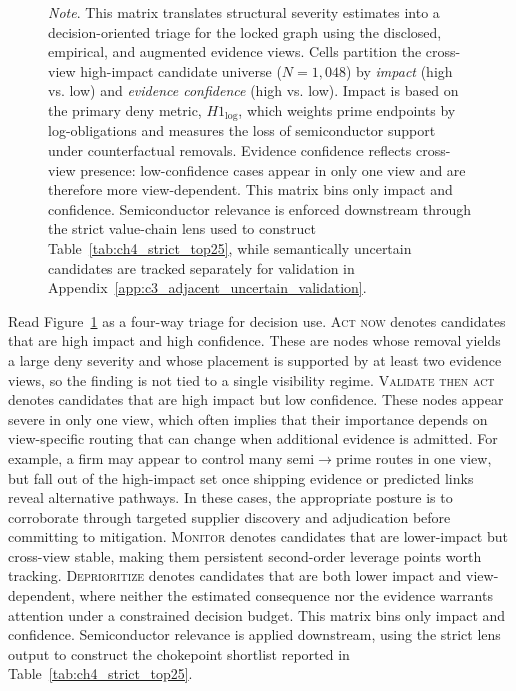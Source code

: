 \begin{figure}[tbp]
  \centering
  \caption[\textit{Action matrix for prioritizing structural chokepoints}]{\textit{Action matrix for prioritizing structural chokepoints}}
  \label{fig:ch4_action_matrix}
  

  \captionsetup{justification=raggedright,singlelinecheck=false}
  \caption*{\footnotesize \textit{Note}. This matrix translates structural severity estimates into a decision-oriented triage for the locked graph using the disclosed, empirical, and augmented evidence views. Cells partition the cross-view high-impact candidate universe ($N=1{,}048$) by \textit{impact} (high vs. low) and \textit{evidence confidence} (high vs. low). Impact is based on the primary deny metric, $H1_{\log}$, which weights prime endpoints by log-obligations and measures the loss of semiconductor support under counterfactual removals. Evidence confidence reflects cross-view presence: low-confidence cases appear in only one view and are therefore more view-dependent. This matrix bins only impact and confidence. Semiconductor relevance is enforced downstream through the strict value-chain lens used to construct Table~\ref{tab:ch4_strict_top25}, while semantically uncertain candidates are tracked separately for validation in Appendix~\ref{app:c3_adjacent_uncertain_validation}.}
\end{figure}

Read Figure~\ref{fig:ch4_action_matrix} as a four-way triage for decision use. \textsc{Act now} denotes candidates that are high impact and high confidence. These are nodes whose removal yields a large deny severity and whose placement is supported by at least two evidence views, so the finding is not tied to a single visibility regime. \textsc{Validate then act} denotes candidates that are high impact but low confidence. These nodes appear severe in only one view, which often implies that their importance depends on view-specific routing that can change when additional evidence is admitted. For example, a firm may appear to control many semi$\rightarrow$prime routes in one view, but fall out of the high-impact set once shipping evidence or predicted links reveal alternative pathways. In these cases, the appropriate posture is to corroborate through targeted supplier discovery and adjudication before committing to mitigation. \textsc{Monitor} denotes candidates that are lower-impact but cross-view stable, making them persistent second-order leverage points worth tracking. \textsc{Deprioritize} denotes candidates that are both lower impact and view-dependent, where neither the estimated consequence nor the evidence warrants attention under a constrained decision budget. This matrix bins only impact and confidence. Semiconductor relevance is applied downstream, using the strict lens output to construct the chokepoint shortlist reported in Table~\ref{tab:ch4_strict_top25}.

